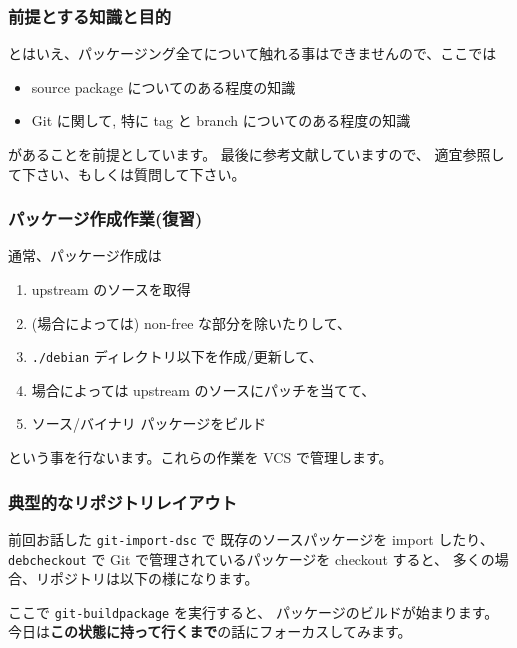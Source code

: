\documentclass[mingoth,a4paper]{jsarticle}
\begin{document}
\subsubsection*{前提とする知識と目的}
\label{sec-1-2}


とはいえ、パッケージング全てについて触れる事はできませんので、ここでは
\begin{itemize}
\item source package についてのある程度の知識
\item Git に関して, 特に tag と branch についてのある程度の知識
\end{itemize}
があることを前提としています。
最後に参考文献していますので、
適宜参照して下さい、もしくは質問して下さい。

\subsubsection*{パッケージ作成作業(復習)}
\label{sec-1-3}

通常、パッケージ作成は

\begin{enumerate}
\item upstream のソースを取得
\item (場合によっては) non-free な部分を除いたりして、
\item \texttt{./debian} ディレクトリ以下を作成/更新して、
\item 場合によっては upstream のソースにパッチを当てて、
\item ソース/バイナリ パッケージをビルド
\end{enumerate}

という事を行ないます。これらの作業を VCS で管理します。

\subsubsection*{典型的なリポジトリレイアウト}
\label{sec-1-4}

前回お話した \texttt{git-import-dsc} で
既存のソースパッケージを import したり、
\texttt{debcheckout} で Git で管理されているパッケージを
checkout すると、
多くの場合、リポジトリは以下の様になります。
ここで \texttt{git-buildpackage} を実行すると、
パッケージのビルドが始まります。
今日は\textbf{この状態に持って行くまで}の話にフォーカスしてみます。
\end{document}
